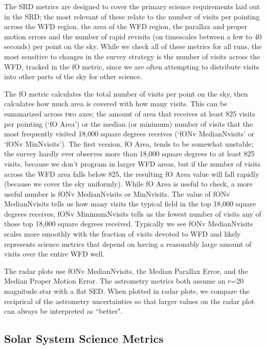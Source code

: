 The SRD metrics are designed to cover the primary science requirements laid out in the SRD; the most relevant of these relate to the number of visits per pointing across the WFD region, the area of the WFD region, the parallax and proper motion errors and the number of rapid revisits (on timescales between a few to 40 seconds) per point on the sky. While we check all of these metrics for all runs, the most sensitive to changes in the survey strategy is the number of visits across the WFD, tracked in the fO metric, since we are often attempting to distribute visits into other parts of the sky for other science. 

The fO metric calculates the total number of visits per point on the sky, then calculates how much area is covered with how many visits. This can be summarized across two axes; the amount of area that receives at least 825 visits per pointing (`fO Area') or the median (or minimum) number of visits that the most frequently visited 18,000 square degrees receives (`fONv MedianNvisits' or `fONv MinNvisits'). The first version, fO Area, tends to be somewhat unstable; the survey hardly ever observes more than 18,000 square degrees to at least 825 visits, because we don't program in larger WFD areas, but if the number of visits across the WFD area falls below 825, the resulting fO Area value will fall rapidly (because we cover the sky uniformly). While fO Area is useful to check, a more useful number is fONv MedianNvisits or MinNvisits. The value of fONv MedianNvisits tells us how many visits the typical field in the top 18,000 square degrees receives; fONv MinimumNvisits tells us the fewest number of visits any of those top 18,000 square degrees received. Typically we see fONv MedianNvisits scales more smoothly with the fraction of visits devoted to WFD and likely represents science metrics that depend on having a reasonably large amount of visits over the entire WFD well. 

The radar plots use fONv MedianNvisits, the Median Parallax Error, and the Median Proper Motion Error. The astrometry metrics both assume an $r$=20 magnitude star with a flat SED. When plotted in radar plots, we compare the reciprical of the astrometry uncertainties so that larger values on the radar plot can always be interpreted as ``better".

\subsection{Solar System Science Metrics}

